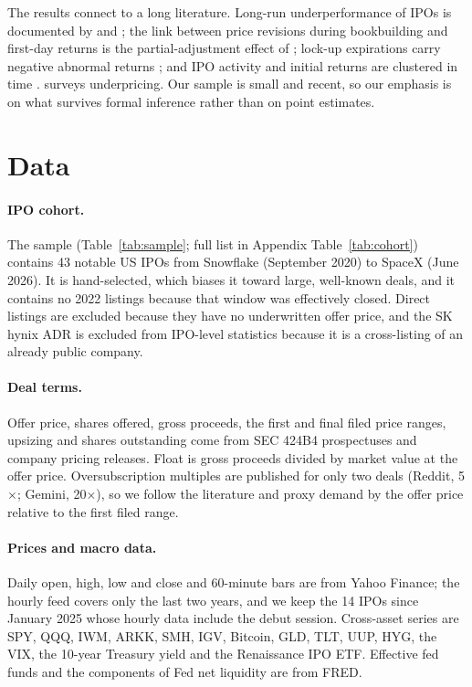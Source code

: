 \documentclass[11pt]{article}
\begin{document}
The results connect to a long literature. Long-run underperformance of IPOs is documented by \citet{ritter1991} and \citet{loughran1995}; the link between price revisions during bookbuilding and first-day returns is the partial-adjustment effect of \citet{hanley1993}; lock-up expirations carry negative abnormal returns \citep{field2001,aggarwal2002}; and IPO activity and initial returns are clustered in time \citep{lowry2002}. \citet{ljungqvist2007} surveys underpricing. Our sample is small and recent, so our emphasis is on what survives formal inference rather than on point estimates.

\section{Data}

\paragraph{IPO cohort.} The sample (Table~\ref{tab:sample}; full list in Appendix Table~\ref{tab:cohort}) contains 43 notable US IPOs from Snowflake (September 2020) to SpaceX (June 2026). It is hand-selected, which biases it toward large, well-known deals, and it contains no 2022 listings because that window was effectively closed. Direct listings are excluded because they have no underwritten offer price, and the SK hynix ADR is excluded from IPO-level statistics because it is a cross-listing of an already public company.

\paragraph{Deal terms.} Offer price, shares offered, gross proceeds, the first and final filed price ranges, upsizing and shares outstanding come from SEC 424B4 prospectuses and company pricing releases. Float is gross proceeds divided by market value at the offer price. Oversubscription multiples are published for only two deals (Reddit, 5$\times$; Gemini, 20$\times$), so we follow the literature and proxy demand by the offer price relative to the first filed range.

\paragraph{Prices and macro data.} Daily open, high, low and close and 60-minute bars are from Yahoo Finance; the hourly feed covers only the last two years, and we keep the 14 IPOs since January 2025 whose hourly data include the debut session. Cross-asset series are SPY, QQQ, IWM, ARKK, SMH, IGV, Bitcoin, GLD, TLT, UUP, HYG, the VIX, the 10-year Treasury yield and the Renaissance IPO ETF. Effective fed funds and the components of Fed net liquidity are from FRED.
\end{document}
